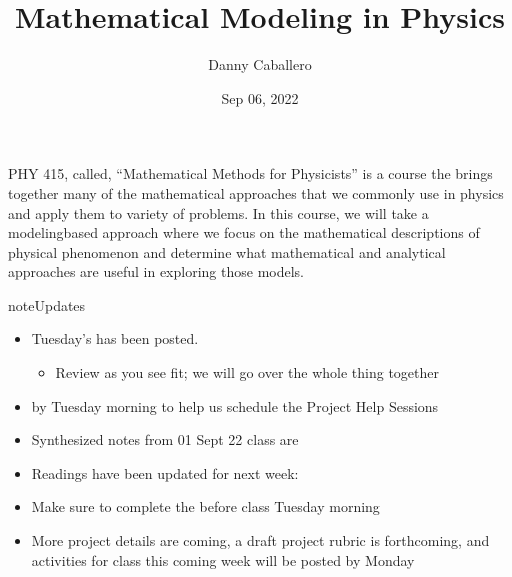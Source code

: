 \documentclass[letterpaper,10pt,english]{jupyterBook}
\title{Mathematical Modeling in Physics}
\date{Sep 06, 2022}
\author{Danny Caballero}
\begin{document}
\pagestyle{empty}
\sphinxmaketitle
\pagestyle{plain}
\sphinxtableofcontents
\pagestyle{normal}
\label{\detokenize{content/intro::doc}}


\sphinxAtStartPar
PHY 415, called, “Mathematical Methods for Physicists” is a course the brings together many of the mathematical approaches that we commonly use in physics and apply them to variety of problems. In this course, we will take a modeling\sphinxhyphen{}based approach where we focus on the mathematical descriptions of physical phenomenon and determine what mathematical and analytical approaches are useful in exploring those models.

\begin{sphinxadmonition}{note}{Updates}

\sphinxAtStartPar
{}
\begin{itemize}
\item {} 
\sphinxAtStartPar
Tuesday’s  has been posted.
\begin{itemize}
\item {} 
\sphinxAtStartPar
Review as you see fit; we will go over the whole thing together

\end{itemize}

\end{itemize}

\sphinxAtStartPar
{}
\begin{itemize}
\item {} 
\sphinxAtStartPar
{} by Tuesday morning to help us schedule the Project Help Sessions

\item {} 
\sphinxAtStartPar
Synthesized notes from 01 Sept 22 class are {\hyperref[\detokenize{content/1_modeling/notes-what_is_a_model::doc}]{}}

\item {} 
\sphinxAtStartPar
Readings have been updated for next week: {\hyperref[\detokenize{content/2_oscillations/readings-oscillators::doc}]{}}

\item {} 
\sphinxAtStartPar
Make sure to complete the {\hyperref[\detokenize{content/0_course/reading_questions::doc}]{}} before class Tuesday morning

\item {} 
\sphinxAtStartPar
More project details are coming, a draft project rubric is forthcoming, and activities for class this coming week will be posted by Monday

\end{itemize}
\end{sphinxadmonition}
\end{document}
